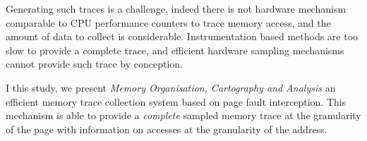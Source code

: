 Generating such traces is a challenge, indeed there is not hardware mechanism
comparable to CPU performance counters to trace memory access, and the amount
of data to collect is considerable. Instrumentation based methods are too slow
to provide a complete trace, and efficient hardware sampling mechanisms cannot
provide such trace by conception.

I this study, we present \emph{Memory Organisation, Cartography and Analysis}
an efficient memory trace collection system based on page fault interception.
This mechanism is able to provide a \emph{complete} sampled memory trace at
the granularity of the page with information on accesses at the granularity of
the address.

